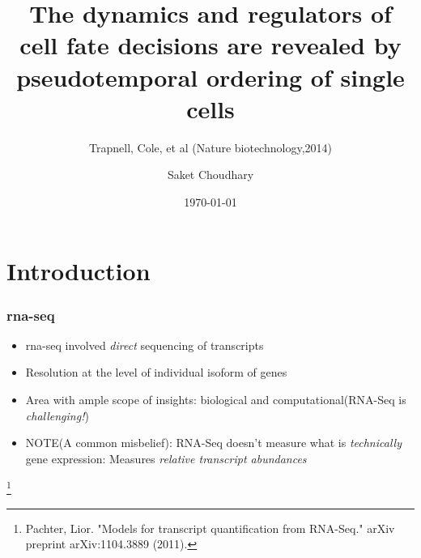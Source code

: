 \documentclass[10pt]{beamer}
\title{The dynamics and regulators of cell fate decisions are revealed by pseudotemporal ordering of single cells}
\subtitle{ Trapnell, Cole, et al (Nature biotechnology,2014)}
\date{\today}
\author{Saket Choudhary}
\newcommand\blfootnote[1]{%
	\begingroup
	\renewcommand\thefootnote{}\footnote{#1}%
	\addtocounter{footnote}{-1}%
	\endgroup
}
\begin{document}
\maketitle


\section{Introduction}

\begin{frame}[fragile]
  \frametitle{rna-seq}
  \begin{itemize}[<+- | alert@+>]
\item rna-seq involved \emph{direct} sequencing of transcripts
\item Resolution at the level of individual isoform of genes
\item Area with ample scope of insights: biological and computational(RNA-Seq is \emph{challenging!})
\item  NOTE(A common misbelief): RNA-Seq doesn't measure what is \emph{technically} gene expression: Measures \emph{relative transcript abundances }
  \end{itemize}
  

  \blfootnote{Pachter, Lior. "Models for transcript quantification from RNA-Seq." arXiv preprint arXiv:1104.3889 (2011).}
\end{frame}
\end{document}
